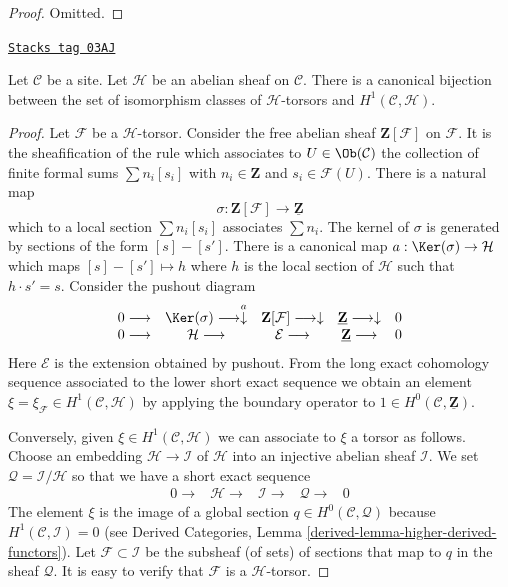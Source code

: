 \begin{proof}
Omitted.
\end{proof}

\begin{lemma}[Torsors h1]
\label{sites-cohomology-lemma-torsors-h1}
\href{https://stacks.math.columbia.edu/tag/03AJ}{\texttt{Stacks tag 03AJ}}

Let $\mathcal{C}$ be a site.
Let $\mathcal{H}$ be an abelian sheaf on $\mathcal{C}$.
There is a canonical bijection between the set of isomorphism
classes of $\mathcal{H}$-torsors and $H^1(\mathcal{C}, \mathcal{H})$.
\end{lemma}

\begin{proof}
Let $\mathcal{F}$ be a $\mathcal{H}$-torsor.
Consider the free abelian sheaf $\mathbf{Z}[\mathcal{F}]$
on $\mathcal{F}$. It is the sheafification of the rule
which associates to $U \in \Ob(\mathcal{C})$ the collection of finite
formal sums $\sum n_i[s_i]$ with $n_i \in \mathbf{Z}$
and $s_i \in \mathcal{F}(U)$. There is a natural map
$$
\sigma : \mathbf{Z}[\mathcal{F}] \longrightarrow \underline{\mathbf{Z}}
$$
which to a local section $\sum n_i[s_i]$ associates $\sum n_i$.
The kernel of $\sigma$ is generated by sections of the form
$[s] - [s']$. There is a canonical map
$a : \Ker(\sigma) \to \mathcal{H}$
which maps $[s] - [s'] \mapsto h$ where $h$ is the local section of
$\mathcal{H}$ such that $h \cdot s' = s$. Consider the pushout diagram
$$
\begin{array}{ccccc}0 \longrightarrow & \Ker(\sigma) \longrightarrow\overset{a}{\downarrow} & \mathbf{Z}[\mathcal{F}] \longrightarrow\downarrow & \underline{\mathbf{Z}} \longrightarrow\downarrow & 0 \\ 0 \longrightarrow & \mathcal{H} \longrightarrow & \mathcal{E} \longrightarrow & \underline{\mathbf{Z}} \longrightarrow & 0\end{array}
$$
Here $\mathcal{E}$ is the extension obtained by pushout.
From the long exact cohomology sequence associated to the lower
short exact sequence we obtain an element
$\xi = \xi_\mathcal{F} \in H^1(\mathcal{C}, \mathcal{H})$
by applying the boundary operator to
$1 \in H^0(\mathcal{C}, \underline{\mathbf{Z}})$.

\medskip\noindent
Conversely, given $\xi \in H^1(\mathcal{C}, \mathcal{H})$ we can associate to
$\xi$ a torsor as follows. Choose an embedding $\mathcal{H} \to \mathcal{I}$
of $\mathcal{H}$ into an injective abelian sheaf $\mathcal{I}$. We set
$\mathcal{Q} = \mathcal{I}/\mathcal{H}$ so that we have a short exact
sequence
$$
\begin{array}{ccccc}0 \longrightarrow & \mathcal{H} \longrightarrow & \mathcal{I} \longrightarrow & \mathcal{Q} \longrightarrow & 0\end{array}
$$
The element $\xi$ is the image of a global section
$q \in H^0(\mathcal{C}, \mathcal{Q})$
because $H^1(\mathcal{C}, \mathcal{I}) = 0$ (see
Derived Categories, Lemma \ref{derived-lemma-higher-derived-functors}).
Let $\mathcal{F} \subset \mathcal{I}$ be the subsheaf (of sets) of sections
that map to $q$ in the sheaf $\mathcal{Q}$. It is easy to verify that
$\mathcal{F}$ is a $\mathcal{H}$-torsor.


\end{proof}

